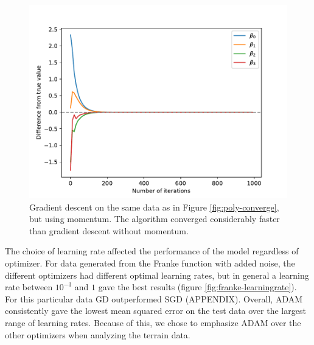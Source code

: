 \begin{figure}
    \centering
    \includegraphics[width=0.99\linewidth]{examples/tests_even/figs/gradient-descent-momentum-polynomial-convergence.pdf}
    \caption{Gradient descent on the same data as in Figure \ref{fig:poly-converge}, but using momentum. The algorithm converged considerably faster than gradient descent without momentum.}
    \label{fig:poly-converge-momentum}
\end{figure}

The choice of learning rate affected the performance of the model regardless of optimizer. For data generated from the Franke function \cite{franke1979} with added noise, the different optimizers had different optimal learning rates, but in general a learning rate between $10^{-3}$ and $1$ gave the best results (figure \ref{fig:franke-learningrate}). For this particular data GD outperformed SGD (APPENDIX). Overall, ADAM consistently gave the lowest mean squared error on the test data over the largest range of learning rates. Because of this, we chose to emphasize ADAM over the other optimizers when analyzing the terrain data.   

